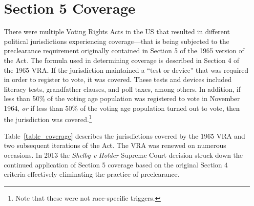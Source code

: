 \documentclass[12pt]{article}
\begin{document}
\section{Section 5 Coverage}\label{appendix_coverage}
\setcounter{table}{0}
\setcounter{figure}{0}
\renewcommand{\thetable}{B\arabic{table}}
\renewcommand{\thefigure}{B\arabic{figure}}
\normalsize

There were multiple Voting Rights Acts in the US that resulted in different political jurisdictions experiencing coverage---that is being subjected to the preclearance requirement originally contained in Section 5 of the 1965 version of the Act.  The formula used in determining coverage is described in Section 4 of the 1965 VRA.  If the jurisdiction maintained a ``test or device'' that was required in order to register to vote, it was covered.  These tests and devices included literacy tests, grandfather clauses, and poll taxes, among others.  In addition, if less than 50\% of the voting age population was registered to vote in November 1964, \emph{or} if less than 50\% of the voting age population turned out to vote, then the jurisdiction was covered.\footnote{Note that these were not race-specific triggers.}

Table~\ref{table_coverage} describes the jurisdictions covered by the 1965 VRA and two subsequent iterations of the Act.  The VRA was renewed on numerous occasions.  In 2013 the \emph{Shelby v Holder} Supreme Court decision struck down the continued application of Section 5 coverage based on the original Section 4 criteria effectively eliminating the practice of preclearance.
\end{document}
